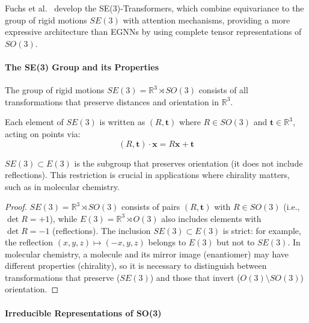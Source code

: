 Fuchs et al.~\citep{fuchs2020se3transformers} develop the SE(3)-Transformers, which combine equivariance to the group of rigid motions $SE(3)$ with attention mechanisms, providing a more expressive architecture than EGNNs by using complete tensor representations of $SO(3)$.

\paragraph{The SE(3) Group and its Properties}

\begin{definition}[Group SE(3)]
The group of rigid motions $SE(3) = \mathbb{R}^3 \rtimes SO(3)$ consists of all transformations that preserve distances and orientation in $\mathbb{R}^3$.
\end{definition}

Each element of $SE(3)$ is written as $(R, \mathbf{t})$ where $R \in SO(3)$ and $\mathbf{t} \in \mathbb{R}^3$, acting on points via:
\begin{equation}
(R, \mathbf{t}) \cdot \mathbf{x} = R\mathbf{x} + \mathbf{t}
\end{equation}

\begin{proposition}
$SE(3) \subset E(3)$ is the subgroup that preserves orientation (it does not include reflections). This restriction is crucial in applications where chirality matters, such as in molecular chemistry.
\end{proposition}

\begin{proof}
$SE(3) = \mathbb{R}^3 \rtimes SO(3)$ consists of pairs $(R, \mathbf{t})$ with $R \in SO(3)$ (i.e., $\det R = +1$), while $E(3) = \mathbb{R}^3 \rtimes O(3)$ also includes elements with $\det R = -1$ (reflections). The inclusion $SE(3) \subset E(3)$ is strict: for example, the reflection $(x,y,z) \mapsto (-x,y,z)$ belongs to $E(3)$ but not to $SE(3)$. In molecular chemistry, a molecule and its mirror image (enantiomer) may have different properties (chirality), so it is necessary to distinguish between transformations that preserve ($SE(3)$) and those that invert ($O(3) \setminus SO(3)$) orientation.
\end{proof}

\paragraph{Irreducible Representations of SO(3)}

